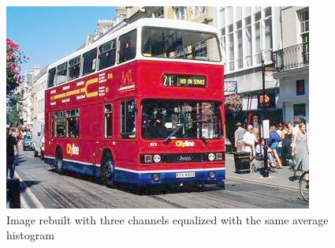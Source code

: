 \documentclass{article}
\begin{document}
\begin{figure}[h]
	\centering
	\includegraphics[width=288pt]{../result/hist/hist-together.png}
	\caption{Image rebuilt with three channels equalized with the same average histogram}
\end{figure}
\end{document}
